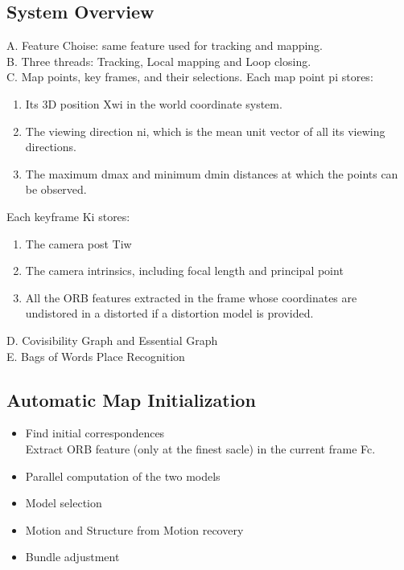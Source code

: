 \documentclass{article}
\begin{document}
\subsection{System Overview}
A. Feature Choise: same feature used for tracking and mapping.\\
B. Three threads: Tracking, Local mapping and Loop closing.\\
C. Map points, key frames, and their selections.
Each map point pi stores:
\begin{enumerate}
\item Its 3D position Xwi in the world coordinate system.
\item The viewing direction ni, which is the mean unit vector of all its viewing directions.
\item The maximum dmax and minimum dmin distances at which the points can be observed.
\end{enumerate}
Each keyframe Ki stores:
\begin{enumerate}
\item The camera post Tiw
\item The camera intrinsics, including focal length and principal point
\item All the ORB features extracted in the frame whose coordinates are undistored in a distorted if a distortion model is provided.
\end{enumerate}
D. Covisibility Graph and Essential Graph\\
E. Bags of Words Place Recognition
\subsection{Automatic Map Initialization}
\begin{itemize}
\item Find initial correspondences\\
Extract ORB feature (only at the finest sacle) in the current frame Fc.
\item Parallel computation of the two models
\item Model selection
\item Motion and Structure from Motion recovery
\item Bundle adjustment
\end{itemize}
\end{document}

